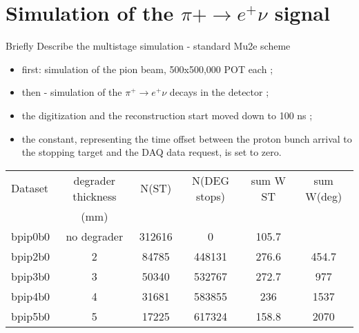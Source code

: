 \section{Simulation of the $\pi+ \to e^+ \nu $ signal }

{\red Briefly Describe the multistage simulation - standard Mu2e scheme
  \begin{itemize}
  \item
    first: simulation of the pion beam, 500x500,000 POT each ;
  \item
    then - simulation of the $\pi^+ \to e^+ \nu$ decays in the detector ;
  \item
    the digitization and the reconstruction start moved down to 100 ns ;
  \item
    the constant, representing the time offset between the proton bunch arrival
    to the stopping target and the DAQ data request, is set to zero.
  \end{itemize}
}

\begin{tabularx}{1.0\textwidth} {|X|c|c|c|c|c|}  %
  \hline
  Dataset             & degrader thickness & N(ST)       & N(DEG stops) & sum W ST  & sum W(deg)   \\
                      & (mm)               &             &              &           &              \\
  \hline                                                                                          
  bpip0b0             &  no degrader       &   312616    &     0        &   105.7   &              \\
  \hline                                                                                          
  bpip2b0             &     2              &   84785     &   448131     &   276.6   &   454.7      \\
  \hline                                                                                          
  bpip3b0             &     3              &   50340     &   532767     &  272.7    &   977        \\
  \hline                                                                                        
  bpip4b0             &     4              &   31681     &   583855     &  236      &  1537        \\
  \hline                                                                                          
  bpip5b0             &     5              &   17225     &   617324     &  158.8    &   2070       \\
  \hline
\end{tabularx}

